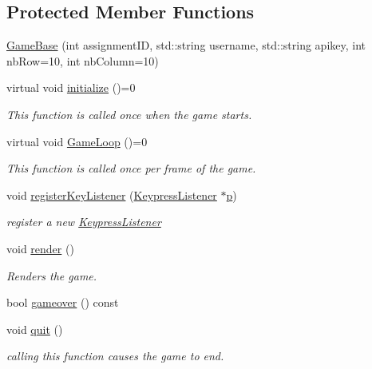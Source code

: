 \subsection*{Protected Member Functions}
\begin{DoxyCompactItemize}
\item 
\hyperlink{classbridges_1_1_game_base_ab10dc09af0e332770d214f822040f977}{Game\+Base} (int assignment\+ID, std\+::string username, std\+::string apikey, int nb\+Row=10, int nb\+Column=10)
\item 
virtual void \hyperlink{classbridges_1_1_game_base_ae19dd2b80fdda7736f5ab22ff89a0873}{initialize} ()=0
\begin{DoxyCompactList}\small\item\em This function is called once when the game starts. \end{DoxyCompactList}\item 
virtual void \hyperlink{classbridges_1_1_game_base_a46334f53935edc32d73d5e37ca8d2603}{Game\+Loop} ()=0
\begin{DoxyCompactList}\small\item\em This function is called once per frame of the game. \end{DoxyCompactList}\item 
void \hyperlink{classbridges_1_1_game_base_a64dd212f3b3252d53a629266ef6fc30b}{register\+Key\+Listener} (\hyperlink{classbridges_1_1_keypress_listener}{Keypress\+Listener} $\ast$\hyperlink{namespacebridges_acfb0a4f7877d8f63de3e6862004c50eda83878c91171338902e0fe0fb97a8c47a}{p})
\begin{DoxyCompactList}\small\item\em register a new \hyperlink{classbridges_1_1_keypress_listener}{Keypress\+Listener} \end{DoxyCompactList}\item 
void \hyperlink{classbridges_1_1_game_base_a7b05208b74523a3add8502fdc7659b15}{render} ()
\begin{DoxyCompactList}\small\item\em Renders the game. \end{DoxyCompactList}\item 
bool \hyperlink{classbridges_1_1_game_base_ad3ac7f4a90a8e9041696f0fca5249b5b}{gameover} () const
\item 
void \hyperlink{classbridges_1_1_game_base_aa31abcf3f253d701ce6c9c51e0a41ec5}{quit} ()
\begin{DoxyCompactList}\small\item\em calling this function causes the game to end. \end{DoxyCompactList}\item 

\end{DoxyCompactItemize}
